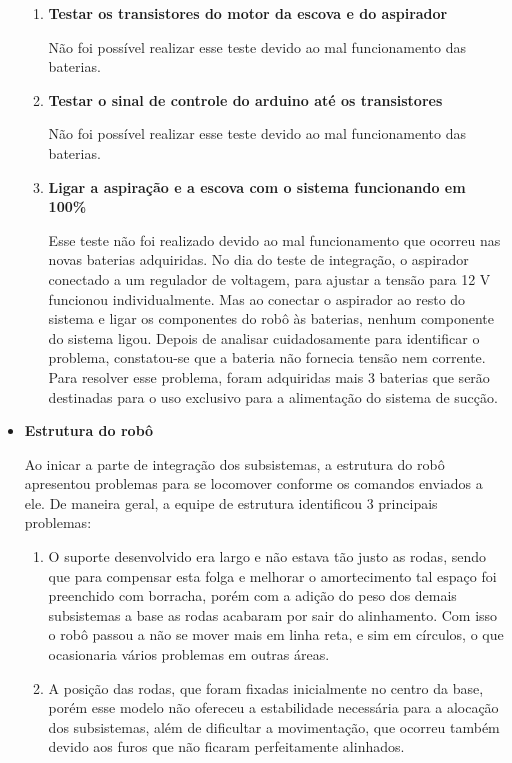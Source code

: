 \begin{itemize}
\begin{enumerate}
		      \item \textbf{Testar os transistores do motor da escova e do aspirador}

		         Não foi possível realizar esse teste devido ao mal funcionamento das baterias. 

		      \item \textbf{Testar o sinal de controle do arduino até os transistores}

		         Não foi possível realizar esse teste devido ao mal funcionamento das baterias. 

		      \item \textbf{Ligar a aspiração e a escova com o sistema funcionando em 100\%}

		         Esse teste não foi realizado devido ao mal funcionamento que ocorreu nas novas baterias adquiridas. No dia do teste de integração, o aspirador conectado a um regulador de voltagem, para ajustar a tensão para 12 V funcionou individualmente. Mas ao conectar o aspirador ao resto do sistema e ligar os componentes do robô às baterias, nenhum componente do sistema ligou. Depois de analisar cuidadosamente para identificar o problema, constatou-se que a bateria não fornecia tensão nem corrente. Para resolver esse problema, foram adquiridas mais 3 baterias que serão destinadas para o uso exclusivo para a alimentação do sistema de sucção. 
		   \end{enumerate}

		\item \textbf{Estrutura do robô}

		Ao inicar a parte de integração dos subsistemas, a estrutura do robô apresentou problemas para se locomover conforme os comandos enviados a ele. De maneira geral, a equipe de estrutura identificou 3 principais problemas: 

		\begin{enumerate}
   			\item O suporte desenvolvido era largo e não estava tão justo as rodas, sendo que para compensar esta folga e melhorar o amortecimento tal espaço foi preenchido com borracha, porém com a adição do peso dos demais subsistemas a base as rodas acabaram por sair do alinhamento. Com isso o robô passou a não se mover mais em linha reta, e sim em círculos, o que ocasionaria vários problemas em outras áreas.

   			\item A posição das rodas, que foram fixadas inicialmente no centro da base, porém esse modelo não ofereceu a estabilidade necessária para a alocação dos subsistemas, além de dificultar a movimentação, que ocorreu também devido aos furos que não ficaram perfeitamente alinhados.


\end{enumerate}
\end{itemize}
